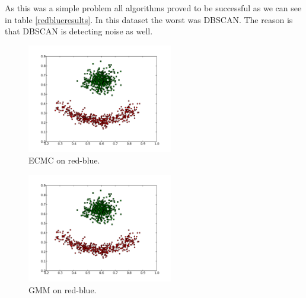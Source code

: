 \documentclass[conference]{IEEEtran}
\begin{document}
As this was a simple problem all algorithms proved to be successful as we can see in table \ref{redblueresults}. In this
dataset the worst was DBSCAN. The reason is that DBSCAN is detecting noise as well.

\begin{figure}[th]
\centering
\includegraphics[width=15pc]{ECMC_red-blue-clusters.pdf}
\caption{ECMC on red-blue.}
\label{ECMC_redblue}
\end{figure}

\begin{figure}[th]
\centering
\includegraphics[width=15pc]{GMM_red-blue-clusters.pdf}
\caption{GMM on red-blue.}
\label{GMM_redblue}
\end{figure}
\end{document}
